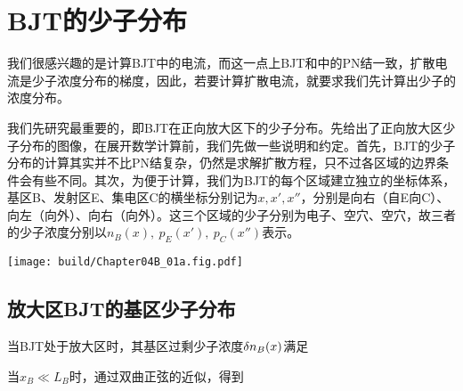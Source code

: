 \section{BJT的少子分布}

我们很感兴趣的是计算BJT中的电流，而这一点上BJT和中的PN结一致，扩散电流是少子浓度分布的梯度，因此，若要计算扩散电流，就要求我们先计算出少子的浓度分布。

我们先研究最重要的，即BJT在正向放大区下的少子分布。先给出了正向放大区少子分布的图像，在展开数学计算前，我们先做一些说明和约定。首先，BJT的少子分布的计算其实并不比PN结复杂，仍然是求解扩散方程，只不过各区域的边界条件会有些不同。其次，为便于计算，我们为BJT的每个区域建立独立的坐标体系，基区B、发射区E、集电区C的横坐标分别记为$x, x', x''$，分别是向右（自E向C）、向左（向外）、向右（向外）。这三个区域的少子分别为电子、空穴、空穴，故三者的少子浓度分别以$n_B(x),\ p_E(x'),\ p_{C}(x'')$表示。

\begin{Figure}[BJT在正向放大区的少子分布]
    \texttt{[image: build/Chapter04B\_01a.fig.pdf]}
\end{Figure}

\subsection{放大区BJT的基区少子分布}
\begin{BoxFormula}[放大区BJT的基区少子分布]
    当BJT处于放大区时，其基区过剩少子浓度$\delta{n_B}(x)$满足
    当$x_B\ll L_B$时，通过双曲正弦的近似，得到
\end{BoxFormula}

